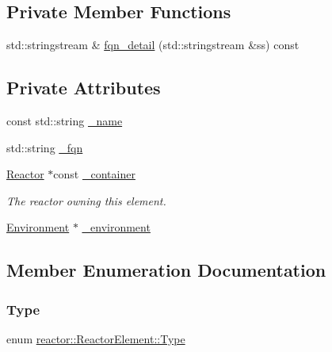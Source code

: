 \subsection*{Private Member Functions}
\begin{DoxyCompactItemize}
\item 
std\+::stringstream \& \hyperlink{classreactor_1_1ReactorElement_a8adcf9dcdd516372915527106a263273}{fqn\+\_\+detail} (std\+::stringstream \&ss) const
\end{DoxyCompactItemize}
\subsection*{Private Attributes}
\begin{DoxyCompactItemize}
\item 
const std\+::string \hyperlink{classreactor_1_1ReactorElement_a228fa190e96b14e7ea08bb18e7a95ae7}{\+\_\+name}
\item 
std\+::string \hyperlink{classreactor_1_1ReactorElement_a4c82246281c31e97b3d18c25670f8072}{\+\_\+fqn}
\item 
\hyperlink{classreactor_1_1Reactor}{Reactor} $\ast$const \hyperlink{classreactor_1_1ReactorElement_a247c6863a035b15938b4bbc0a07b664d}{\+\_\+container}
\begin{DoxyCompactList}\small\item\em The reactor owning this element. \end{DoxyCompactList}\item 
\hyperlink{classreactor_1_1Environment}{Environment} $\ast$ \hyperlink{classreactor_1_1ReactorElement_a07b433591c3e20916b46ecd6ef3c2bf8}{\+\_\+environment}
\end{DoxyCompactItemize}


\subsection{Member Enumeration Documentation}
\mbox{\label{classreactor_1_1ReactorElement_a9291659e2893372cfea42ffccfd487b2}} 
\subsubsection{\texorpdfstring{Type}{Type}}
{\footnotesize\ttfamily enum \hyperlink{classreactor_1_1ReactorElement_a9291659e2893372cfea42ffccfd487b2}{reactor\+::\+Reactor\+Element\+::\+Type}\hspace{0.3cm}{\ttfamily [strong]}}

